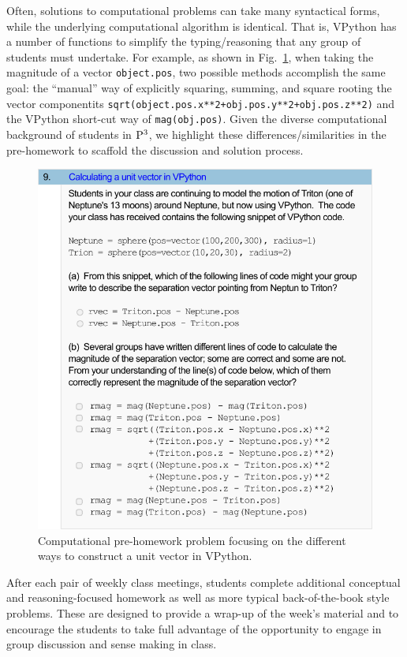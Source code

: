 \documentclass{msuphddissertation}
\begin{document}
\begin{doublespace}
Often, solutions to computational problems can take many syntactical forms, while the underlying computational algorithm is identical.  That is, VPython has a number of functions to simplify the typing/reasoning that any group of students must undertake.  For example, as shown in Fig.~\ref{fig:compHW}, when taking the magnitude of a vector \texttt{object.pos}, two possible methods accomplish the same goal:  the ``manual'' way of explicitly squaring, summing, and square rooting the vector componentits \texttt{sqrt(object.pos.x**2+obj.pos.y**2+obj.pos.z**2)} and the VPython short-cut way of \texttt{mag(obj.pos)}.  Given the diverse computational background of students in ${\rm P}^{3}$, we highlight these differences/similarities in the pre-homework to scaffold the discussion and solution process.

\begin{figure}
\centering
\includegraphics[width=1\linewidth]{./images/comphw.pdf}
\caption{Computational pre-homework problem focusing on the different ways to construct a unit vector in VPython.}\label{fig:compHW}
\end{figure}

After each pair of weekly class meetings, students complete additional conceptual and reasoning-focused homework as well as more typical back-of-the-book style problems.  These are designed to provide a wrap-up of the week's material and to encourage the students to take full advantage of the opportunity to engage in group discussion and sense making in class.


\end{doublespace}
\end{document}
